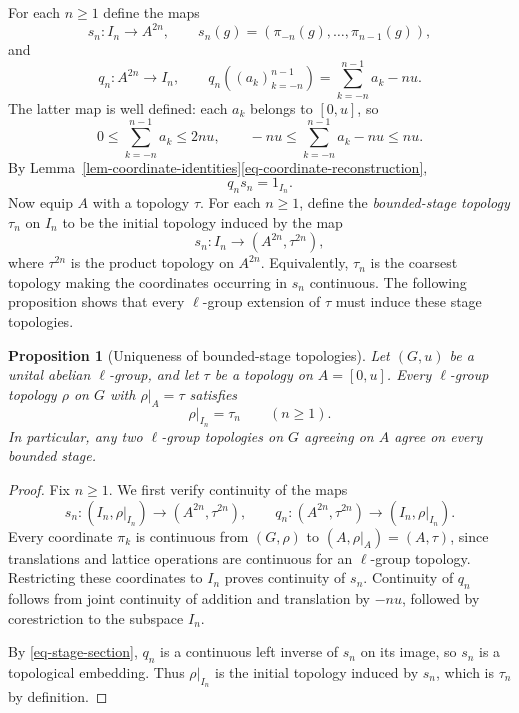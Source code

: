 \documentclass[preprint,3p]{elsarticle}
\theoremstyle{plain}
\newtheorem{prop}[thm]{Proposition}
\theoremstyle{definition}
\numberwithin{equation}{section}
\begin{document}
For each $n\geq1$ define the maps
\begin{equation}
\label{eq-stage-coordinate-map}
 s_n\colon I_n\longrightarrow A^{2n},
 \qquad
 s_n(g)=(\pi_{-n}(g),\ldots,\pi_{n-1}(g)),
\end{equation}
and
\begin{equation}
\label{eq-stage-sum-map}
 q_n\colon A^{2n}\longrightarrow I_n,
 \qquad
 q_n((a_k)_{k=-n}^{n-1})
 =\sum_{k=-n}^{n-1}a_k-nu.
\end{equation}
The latter map is well defined: each $a_k$ belongs to $[0,u]$,
so
\[
 0\leq\sum_{k=-n}^{n-1}a_k\leq2nu,
 \qquad
 -nu\leq\sum_{k=-n}^{n-1}a_k-nu\leq nu.
\]
By Lemma~\ref{lem-coordinate-identities}\ref{eq-coordinate-reconstruction},
\begin{equation}
\label{eq-stage-section}
 q_ns_n=1_{I_n}.
\end{equation}
Now equip $A$ with a topology $\tau$.
For each $n\geq1$, define the \emph{bounded-stage topology} $\tau_n$
on $I_n$ to be the initial topology induced by the map
\begin{equation}
\label{eq-stage-initial-map}
 s_n\colon I_n\longrightarrow(A^{2n},\tau^{2n}),
\end{equation}
where $\tau^{2n}$ is the product topology on $A^{2n}$.
Equivalently, $\tau_n$ is the coarsest topology making the
coordinates occurring in $s_n$ continuous.
The following proposition shows that every $\ell$-group extension
of $\tau$ must induce these stage topologies.

\begin{prop}[Uniqueness of bounded-stage topologies]
\label{prop-lgroup-extension-bounded-stages}
Let $(G,u)$ be a unital abelian $\ell$-group, and let $\tau$ be
a topology on $A=[0,u]$.
Every $\ell$-group topology $\rho$ on $G$ with $\rho|_A=\tau$
satisfies
\[
 \rho|_{I_n}=\tau_n
 \qquad(n\geq1).
\]
In particular, any two $\ell$-group topologies on $G$ agreeing
on $A$ agree on every bounded stage.
\end{prop}

\begin{proof}
Fix $n\geq1$.
We first verify continuity of the maps
\[
 s_n\colon(I_n,\rho|_{I_n})
 \longrightarrow(A^{2n},\tau^{2n}),
 \qquad
 q_n\colon(A^{2n},\tau^{2n})
 \longrightarrow(I_n,\rho|_{I_n}).
\]
Every coordinate $\pi_k$ is continuous from $(G,\rho)$
to $(A,\rho|_A)=(A,\tau)$, since translations and lattice
operations are continuous for an $\ell$-group topology.
Restricting these coordinates to $I_n$ proves continuity of $s_n$.
Continuity of $q_n$ follows from joint continuity of addition and
translation by $-nu$, followed by corestriction to the subspace $I_n$.

By \eqref{eq-stage-section}, $q_n$ is a continuous left inverse
of $s_n$ on its image, so $s_n$ is a topological embedding.
Thus $\rho|_{I_n}$ is the initial topology induced by $s_n$,
which is $\tau_n$ by definition.
\end{proof}
\end{document}
